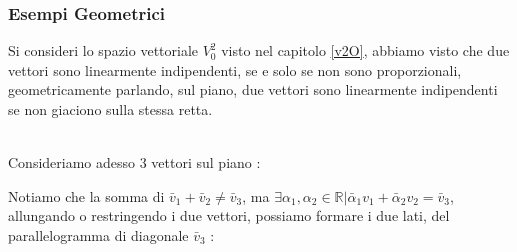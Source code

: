 \documentclass[12pt, letterpaper]{article}
\newcommand{\R}{{\mathbb R}}
\begin{document}
 \subsubsection{Esempi Geometrici}
 Si consideri lo spazio vettoriale \(V_0^2\) visto nel capitolo \ref{v2O}, abbiamo visto che due vettori 
 sono linearmente indipendenti, se e solo se non sono proporzionali, geometricamente parlando, sul piano, 
 due vettori sono linearmente indipendenti se non giaciono sulla stessa retta.\\\hphantom{}\\
 \begin{figure}[h]
\end{figure}
Consideriamo adesso 3 vettori sul piano :\\
\begin{figure}[h]
\end{figure}
Notiamo che la somma di \(\bar v_1+\bar v_2 \ne \bar v_3\), ma \(\exists \alpha_1,\alpha_2\in \R|\bar \alpha_1v_1+\bar \alpha_2v_2 = \bar v_3\), allungando 
o restringendo i due vettori, possiamo formare i due lati, del parallelogramma di diagonale \(\bar v_3\) :
\begin{figure}[h]
 \end{figure}
\end{document}
